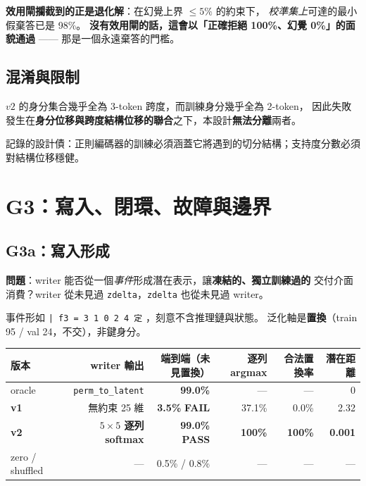 \documentclass[11pt, a4paper]{article}
\newcommand{\PASS}{\textcolor{green!45!black}{\textbf{PASS}}}
\newcommand{\FAIL}{\textcolor{red!70!black}{\textbf{FAIL}}}
\begin{document}
\textbf{效用閘攔截到的正是退化解}：在幻覺上界 $\leq 5\%$ 的約束下，
\emph{校準集上}可達的最小假棄答已是 98\%。
\textbf{沒有效用閘的話，這會以「正確拒絕 100\%、幻覺 0\%」的面貌通過} —— 那是一個永遠棄答的門檻。

\subsection{混淆與限制}

$v2$ 的身分集合幾乎全為 3-token 跨度，而訓練身分幾乎全為 2-token，
因此失敗發生在\textbf{身分位移與跨度結構位移的聯合}之下，本設計\textbf{無法分離}兩者。

記錄的設計債：正則編碼器的訓練必須涵蓋它將遇到的切分結構；支持度分數必須對結構位移穩健。

\section{G3：寫入、閉環、故障與邊界}

\subsection{G3a：寫入形成}

\textbf{問題}：writer 能否從一個\emph{事件}形成潛在表示，讓\textbf{凍結的、獨立訓練過的}
交付介面消費？writer 從未見過 \verb|zdelta|，\verb|zdelta| 也從未見過 writer。

事件形如 \verb :| f3 = 3 1 0 2 4 定: ，刻意不含推理鏈與狀態。
泛化軸是\textbf{置換}（train 95 / val 24，不交），非鍵身分。

\begin{table}[h]
\centering
\small
\begin{tabular}{lrrrrr}
\toprule
版本 & writer 輸出 & 端到端（未見置換）& 逐列 argmax & 合法置換率 & 潛在距離 \\
\midrule
oracle & \verb|perm_to_latent| & \textbf{99.0\%} & --- & --- & 0 \\
\textbf{v1} & 無約束 25 維 & \textbf{3.5\%} \FAIL{} & 37.1\% & 0.0\% & 2.32 \\
\textbf{v2} & \textbf{$5\times5$ 逐列 softmax} & \textbf{99.0\%} \PASS{} & \textbf{100\%} & \textbf{100\%} & \textbf{0.001} \\
zero / shuffled & --- & 0.5\% / 0.8\% & --- & --- & --- \\
\bottomrule
\end{tabular}
\end{table}
\end{document}
